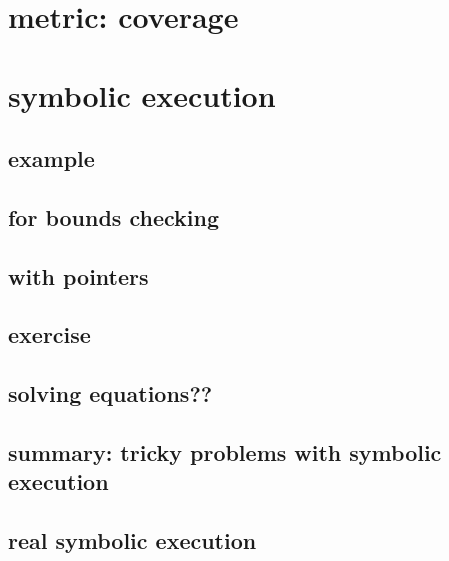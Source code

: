 \section{metric: coverage}


\section{symbolic execution}


\subsection{example}


\subsection{for bounds checking}


\subsection{with pointers}


\subsection{exercise}


\subsection{solving equations??}

\subsection{summary: tricky problems with symbolic execution}


\subsection{real symbolic execution}



